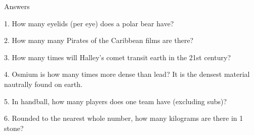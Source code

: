 \begin{frame}
\begin{center}
\Huge
Answers
\end{center}
\end{frame}
\begin{frame}
\begin{center}
\Large
1. How many eyelids (per eye) does a polar bear have?
\\
\end{center}
\end{frame}
\begin{frame}
\begin{center}
\Large
2. How many many Pirates of the Caribbean films are there?
\\
\end{center}
\end{frame}
\begin{frame}
\begin{center}
\Large
3. How many times will Halley's comet transit earth in the 21st century?
\\
\end{center}
\end{frame}
\begin{frame}
\begin{center}
\Large
4. Osmium is how many times more dense than lead? It is the densest material nautrally found on earth.
\\
\end{center}
\end{frame}
\begin{frame}
\begin{center}
\Large
5. In handball, how many players does one team have (excluding subs)?
\\
\end{center}
\end{frame}
\begin{frame}
\begin{center}
\Large
6. Rounded to the nearest whole number, how many kilograms are there in 1 stone?
\\
\end{center}
\end{frame}

